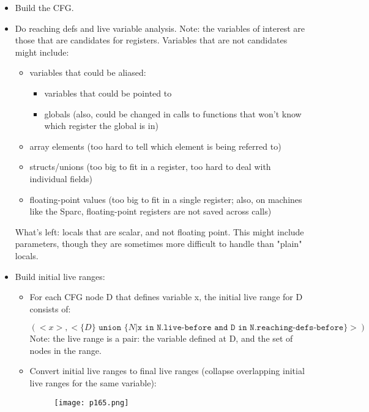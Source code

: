 \begin{itemize}
	\item Build the CFG.
	\item Do reaching defs and live variable analysis.
	      Note: the variables of interest are those that are candidates for registers. Variables that are not candidates might include:
	      \begin{itemize}
		      \item variables that could be aliased:
		            \begin{itemize}
			            \item variables that could be pointed to
			            \item globals (also, could be changed in calls to functions that won't know which register the global is in)
		            \end{itemize}
		      \item array elements (too hard to tell which element is being referred to)
		      \item structs/unions (too big to fit in a register, too hard to deal with individual fields)
		      \item floating-point values (too big to fit in a single register; also, on machines like the Sparc, floating-point registers are not saved across calls)
	      \end{itemize}
		  What's left: locals that are scalar, and not floating point. This might include parameters, though they are sometimes more difficult to handle than "plain" locals.
	\item 	Build initial live ranges:  
	\begin{itemize}
		\item For each CFG node D that defines variable x, the initial live range for D consists of:

		\(( <x>, <\{D\} \texttt{  union } \{N | \texttt{x in N.live-before and D in N.reaching-defs-before}\}> ) \)
		Note: the live range is a pair: the variable defined at D, and the set of nodes in the range.
		\item Convert initial live ranges to final live ranges (collapse overlapping initial live ranges for the same variable):

		\begin{figure}[H]
			\centering
			\texttt{[image: p165.png]}
			\caption{}
			\label{fig:p165}
		\end{figure}


	\end{itemize}
\end{itemize}


